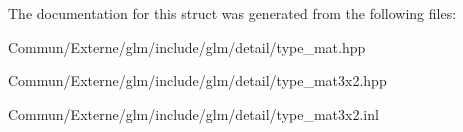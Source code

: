 The documentation for this struct was generated from the following files\+:\begin{DoxyCompactItemize}
\item 
Commun/\+Externe/glm/include/glm/detail/type\+\_\+mat.\+hpp\item 
Commun/\+Externe/glm/include/glm/detail/type\+\_\+mat3x2.\+hpp\item 
Commun/\+Externe/glm/include/glm/detail/type\+\_\+mat3x2.\+inl\end{DoxyCompactItemize}
